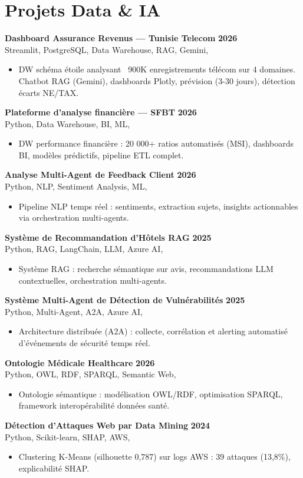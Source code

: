 \documentclass[a4paper,9pt]{article}
\newcommand{\cventry}[4]{\textbf{#1} \hfill \textbf{#4}\\[1pt]#2{\ifx\relax#3\relax\else, #3\fi}\par\vspace{1pt}}
\begin{document}
\section{Projets Data \& IA}
\cventry{Dashboard Assurance Revenus --- Tunisie Telecom}{Streamlit, PostgreSQL, Data Warehouse, RAG, Gemini}{}{2026}
\begin{itemize}
  \item DW schéma étoile analysant ~900K enregistrements télécom sur 4 domaines. Chatbot RAG (Gemini), dashboards Plotly, prévision (3-30 jours), détection écarts NE/TAX.
\end{itemize}
\cventry{Plateforme d'analyse financière --- SFBT}{Python, Data Warehouse, BI, ML}{}{2026}
\begin{itemize}
  \item DW performance financière : 20 000+ ratios automatisés (MSI), dashboards BI, modèles prédictifs, pipeline ETL complet.
\end{itemize}
\cventry{Analyse Multi-Agent de Feedback Client}{Python, NLP, Sentiment Analysis, ML}{}{2026}
\begin{itemize}
  \item Pipeline NLP temps réel : sentiments, extraction sujets, insights actionnables via orchestration multi-agents.
\end{itemize}
\cventry{Système de Recommandation d'Hôtels RAG}{Python, RAG, LangChain, LLM, Azure AI}{}{2025}
\begin{itemize}
  \item Système RAG : recherche sémantique sur avis, recommandations LLM contextuelles, orchestration multi-agents.
\end{itemize}
\cventry{Système Multi-Agent de Détection de Vulnérabilités}{Python, Multi-Agent, A2A, Azure AI}{}{2025}
\begin{itemize}
  \item Architecture distribuée (A2A) : collecte, corrélation et alerting automatisé d'événements de sécurité temps réel.
\end{itemize}
\cventry{Ontologie Médicale Healthcare}{Python, OWL, RDF, SPARQL, Semantic Web}{}{2026}
\begin{itemize}
  \item Ontologie sémantique : modélisation OWL/RDF, optimisation SPARQL, framework interopérabilité données santé.
\end{itemize}
\cventry{Détection d'Attaques Web par Data Mining}{Python, Scikit-learn, SHAP, AWS}{}{2024}
\begin{itemize}
  \item Clustering K-Means (silhouette 0,787) sur logs AWS : 39 attaques (13,8\%), explicabilité SHAP.
\end{itemize}
\end{document}
